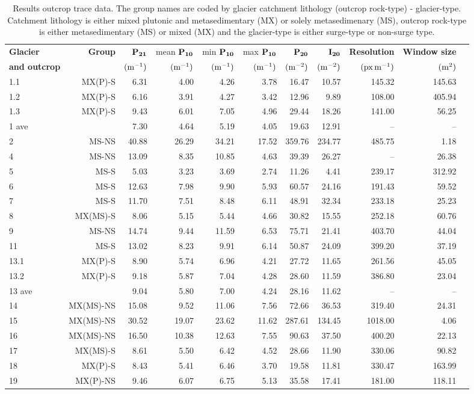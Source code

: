\documentclass[review]{igs}
\begin{document}
\begin{table}[H]
\begin{tabular}{l r r r r r r r r r r}
\hline
\bf{Glacier}&\bf{Group}& $\rm \bf P_{21}$ & mean $\rm \bf P_{10}$ & min $\rm \bf P_{10}$  & max $\rm \bf P_{10}$ & $\rm \bf P_{20}$ & $\rm \bf I_{20}$ & \bf{Resolution} & \bf{Window size}  \\ 
\bf{and outcrop}&&$\rm (m^{-1})$&$\rm (m^{-1})$&$\rm (m^{-1})$&$\rm (m^{-1})$&$\rm (m^{-2})$&$\rm (m^{-2})$&$\rm (px\,m^{-1})$&$\rm (m^{2})$ \\\hline
1.1 & MX(P)-S &6.31&4.00&4.26&3.78&16.47&10.57&145.32&145.63\\\hline
1.2& MX(P)-S &6.16&3.91&4.27&3.42&12.96&9.89&108.00&405.94\\\hline
1.3& MX(P)-S &9.43&6.01&7.05&4.96&29.44&18.26&141.00&56.25\\\hline
1 ave & &7.30&4.64&5.19&4.05&19.63&12.91&--&--\\\hline
2& MS-NS &40.88&26.29&34.21&17.52&359.76&234.77&485.75&1.18\\\hline
4& MS-NS &13.09&8.35&10.85&4.63&39.39&26.27&--&26.38\\\hline
5& MS-S &5.03&3.23&3.69&2.74&11.26&4.41&239.17&312.92\\\hline
6& MS-S  &12.63&7.98&9.90&5.93&60.57&24.16&191.43&59.52\\\hline
7& MS-S  &11.70&7.51&8.48&6.11&48.91&32.34&233.18&25.23\\\hline
8& MX(MS)-S &8.06&5.15&5.44&4.66&30.82&15.55&252.18&60.76\\\hline
9& MS-NS &14.74&9.44&11.59&6.53&75.71&21.41&403.70&44.04\\\hline
11& MS-S &13.02&8.23&9.91&6.14&50.87&24.09&399.20&37.19\\\hline
13.1& MX(P)-S &8.90&5.74&6.96&4.21&27.72&11.65&261.56&45.05\\\hline
13.2& MX(P)-S &9.18&5.87&7.04&4.28&28.60&11.59&386.80&23.04\\\hline
13 ave &  &9.04&5.80&7.00&4.24&28.16&11.62&--&--\\\hline
14& MX(MS)-NS &15.08&9.52&11.06&7.56&72.66&36.53&319.40&24.31\\\hline
15&MX(MS)-NS & 30.52&19.07&23.62&11.62&287.61&134.45&1018.00&4.06\\\hline
16& MX(MS)-NS &16.50&10.38&12.63&7.55&90.63&37.50&400.20&22.13\\\hline
17& MX(MS)-S &8.61&5.50&6.42&4.52&28.66&11.90&330.06&90.82\\\hline
18& MX(P)-S &8.43&5.41&6.46&3.70&19.58&11.81&330.47&163.99\\\hline
19& MX(P)-NS &9.46&6.07&6.75&5.13&35.58&17.41&181.00&118.11\\\hline

\end{tabular}
\caption{Results outcrop trace data. The group names are coded by glacier catchment lithology (outcrop rock-type) - glacier-type. Catchment lithology is either mixed plutonic and metasedimentary (MX) or solely metasedimenary (MS), outcrop rock-type is either metasedimentary (MS) or mixed (MX) and the glacier-type is either surge-type or non-surge type.}
\label{tab1}
\end{table}
\end{document}
